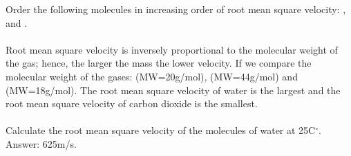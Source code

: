 \documentclass[main.tex]{subfiles}
\newcommand\chapterlabel{Ch-Gas}\setcounter{figurenewcounter}{0}\setcounter{tablenewcounter}{0}\setcounter{formulanewcounter}{0}
\begin{document}
\begin{description}
\begin{example} %
Order the following molecules in increasing order of root mean square velocity: ,  and .\\
\\
Root mean square velocity is inversely proportional to the molecular weight of the gas; hence, the larger the mass the lower velocity. If we compare the molecular weight of the gases: (MW=20g/mol), (MW=44g/mol) and (MW=18g/mol). The root mean square velocity of water is the largest and the root mean square velocity of carbon dioxide is the smallest.
\\
\faDiamond\ \\
Calculate the root mean square velocity of the molecules of water at 25C$^{\circ}$.\\
\flushright Answer: 625m/s.
\end{example}%





      \label{Fig:{\chapterlabel}\thefigurenewcounter} \hspace{0cm}\begin{minipage}[b]{1.7\linewidth}


\end{minipage}
\end{description}
\end{document}
